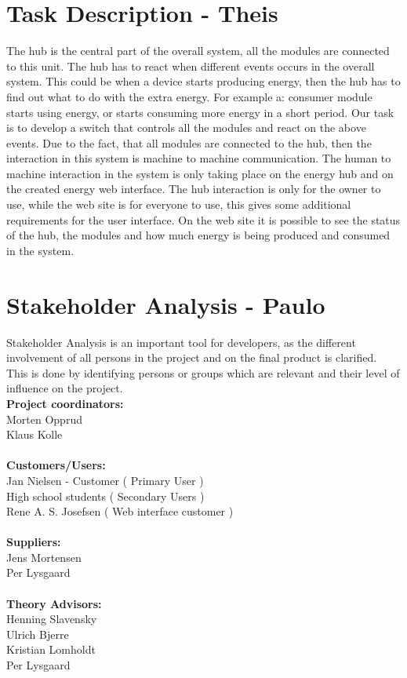 \section{Task Description - Theis}
The hub is the central part of the overall system, all the modules are connected to this unit. The hub has to react when different events occurs in the overall system. This could be when a device starts producing energy, then the hub has to find out what to do with the extra energy. For example a: consumer module starts using energy, or starts consuming more energy in a short period. 
\p
Our task is to develop a switch that controls all the modules and react on the above events. Due to the fact, that all modules are connected to the hub, then the interaction in this system is machine to machine communication. The human to machine interaction in the system is only taking place on the energy hub and on the  created energy web interface. The hub interaction is only for the owner to use, while the web site is for everyone to use, this gives some additional requirements for the user interface. On the web site it is possible to see the status of the hub, the modules and how much energy is being produced and consumed in the system.

\section{Stakeholder Analysis - Paulo}

Stakeholder Analysis is an important tool for developers, as the different involvement of all persons in the project and on the final product is clarified. This is done by identifying persons or groups which are relevant and their level of influence on the project.
\\[0.2cm]
\textbf{Project coordinators:}\\ Morten Opprud\\ Klaus Kolle\\
\\
\textbf{Customers/Users:}\\
Jan Nielsen - Customer ( Primary User )\\
High school students ( Secondary Users )\\
Rene A. S. Josefsen ( Web interface customer )\\
\\
\textbf{Suppliers:}\\
Jens Mortensen\\
Per Lysgaard\\
\\
\textbf{Theory Advisors:}\\
Henning Slavensky\\
Ulrich Bjerre\\
Kristian Lomholdt\\
Per Lysgaard\\


